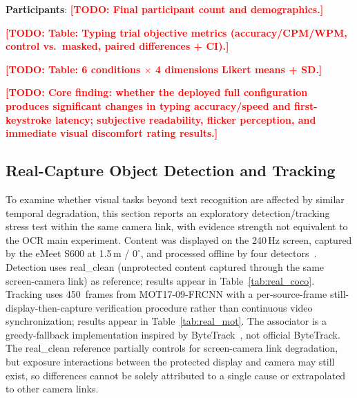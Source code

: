 \documentclass{ieeeaccess}
\newcommand{\TODO}[1]{\textcolor{red}{\textbf{[TODO: #1]}}}
\begin{document}
\textbf{Participants}: \TODO{Final participant count and demographics.}

\TODO{Table: Typing trial objective metrics (accuracy/CPM/WPM, control vs.\ masked, paired differences + CI).}

\TODO{Table: 6 conditions $\times$ 4 dimensions Likert means + SD.}

\TODO{Core finding: whether the deployed full configuration produces significant changes in typing accuracy/speed and first-keystroke latency; subjective readability, flicker perception, and immediate visual discomfort rating results.}

\subsection{Real-Capture Object Detection and Tracking}
\label{sec:detection}

To examine whether visual tasks beyond text recognition are affected by similar temporal degradation, this section reports an exploratory detection/tracking stress test within the same camera link, with evidence strength not equivalent to the OCR main experiment. Content was displayed on the 240\,Hz screen, captured by the eMeet S600 at 1.5\,m / $0^{\circ}$, and processed offline by four detectors~\cite{b_yolo26,b_rtdetr2024,b_fasterrcnn2015,b_retinanet2017}. Detection uses real\_clean (unprotected content captured through the same screen-camera link) as reference; results appear in Table~\ref{tab:real_coco}. Tracking uses 450~frames from MOT17-09-FRCNN with a per-source-frame still-display-then-capture verification procedure rather than continuous video synchronization; results appear in Table~\ref{tab:real_mot}. The associator is a greedy-fallback implementation inspired by ByteTrack~\cite{b_bytetrack2022}, not official ByteTrack. The real\_clean reference partially controls for screen-camera link degradation, but exposure interactions between the protected display and camera may still exist, so differences cannot be solely attributed to a single cause or extrapolated to other camera links.
\end{document}
